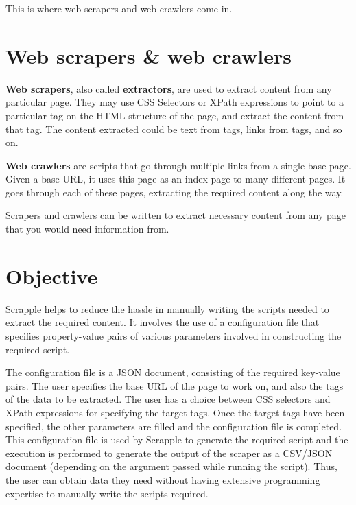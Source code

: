 \documentclass[letterpaper,12pt,english]{sphinxmanual}
\begin{document}
This is where web scrapers and web crawlers come in.


\section{Web scrapers \& web crawlers}
\label{index:web-scrapers-web-crawlers}
\textbf{Web scrapers}, also called \textbf{extractors}, are used to extract content from any particular page. They may use CSS Selectors or XPath expressions to point to a particular tag on the HTML structure of the page, and extract the content from that tag. The content extracted could be text from  tags, links from  tags, and so on.

\textbf{Web crawlers} are scripts that go through multiple links from a single base page. Given a base URL, it uses this page as an index page to many different pages. It goes through each of these pages, extracting the required content along the way.

Scrapers and crawlers can be written to extract necessary content from any page that you would need information from.


\section{Objective}
\label{index:objective}
Scrapple helps to reduce the hassle in manually writing the scripts needed to extract the required content. It involves the use of a configuration file that specifies property-value pairs of various parameters involved in constructing the required script.

The configuration file is a JSON document, consisting of the required key-value pairs. The user specifies the base URL of the page to work on, and also the tags of the data to be extracted. The user has a choice between CSS selectors and XPath expressions for specifying the target tags. Once the target tags have been specified, the other parameters are filled and the configuration file is completed. This configuration file is used by Scrapple to generate the required script and the execution is performed to generate the output of the scraper as a CSV/JSON document (depending on the argument passed while running the script). Thus, the user can obtain data they need without having extensive programming expertise to manually write the scripts required.
\end{document}
